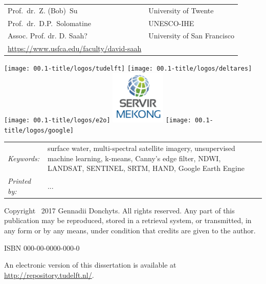 \begin{titlepage}
\begin{tabular}{p{5cm}l}
	Prof.\ dr.\ Z. (Bob)\ Su & University of Twente \\

	Prof.\ dr.\ D.P.\ Solomatine & UNESCO-IHE \\    

	Assoc. Prof. dr. D. Saah? & University of San Francisco \\ \url{https://www.usfca.edu/faculty/david-saah}
\end{tabular}

\medskip

\vfill

\begin{center}
    \texttt{[image: 00.1-title/logos/tudelft]}
    \hspace{1em} 
    \texttt{[image: 00.1-title/logos/deltares]}
	\hspace{1em} \vspace{1em} 
	\texttt{[image: 00.1-title/logos/e2o]} 
\hspace{1em}
	\includegraphics[height=1.0in]{00.1-title/logos/SERVIR-Mekong} 
	\hspace{1em}
    \texttt{[image: 00.1-title/logos/google]} 
\end{center}
\vfill

\noindent
\begin{tabular}{@{}p{}@{}p{}}
    \textit{Keywords:} & {surface water, multi-spectral satellite imagery, unsupervised machine learning, k-means, Canny's edge filter, NDWI, LANDSAT, SENTINEL, SRTM, HAND, Google Earth Engine} \\[\medskipamount]

    \textit{Printed by:} & ... \\[\medskipamount]
\end{tabular}

\vspace{4\bigskipamount}

\noindent Copyright \textcopyright\ 2017 Gennadii Donchyts. All rights reserved. Any part of this publication may be reproduced, stored in a retrieval system, or transmitted, in any form or by any means, under condition that credits are given to the author.

\medskip
\noindent ISBN 000-00-0000-000-0

\medskip
\noindent An electronic version of this dissertation is available at \\
\url{http://repository.tudelft.nl/}.

\end{titlepage}

